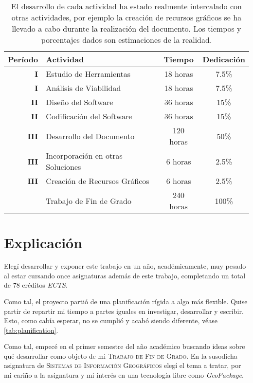 \begin{table}[htbp]
	\centering
	\begin{tabular}{ r ||l | c c}
		\textbf{Período} & \textbf{Actividad} & \textbf{Tiempo} & \textbf{Dedicación} \\
		\hline\hline
		\textbf{I} & Estudio de Herramientas & 18 horas & 7.5\% \\
		\textbf{I} & Análisis de Viabilidad & 18 horas & 7.5\% \\
		\textbf{II} & Diseño del Software & 36 horas & 15\% \\
		\textbf{II} & Codificación del Software & 36 horas & 15\% \\
		\textbf{III} & Desarrollo del Documento & 120 horas & 50\% \\
		\textbf{III} & Incorporación en otras Soluciones & 6 horas & 2.5\% \\
		\textbf{III} & Creación de Recursos Gráficos & 6 horas & 2.5\%\\
		\hline
		 & Trabajo de Fin de Grado & 240 horas & 100\%
	\end{tabular}
	\caption[Planificación por actividad]{El desarrollo de cada actividad ha estado realmente intercalado con otras actividades, por ejemplo la creación de recursos gráficos se ha llevado a cabo durante la realización del documento. Los tiempos y porcentajes dados son estimaciones de la realidad.}
	\label{tab:planification_tasks}
\end{table}

\section*{Explicación}
Elegí desarrollar y exponer este trabajo en un año, académicamente, muy pesado al estar cursando once asignaturas además de este trabajo, completando un total de 78 créditos \textit{ECTS}.

Como tal, el proyecto partió de una planificación rígida a algo más flexible. Quise partir de repartir mi tiempo a partes iguales en investigar, desarrollar y escribir. Esto, como cabía esperar, no se cumplió y acabó siendo diferente, véase \autoref{tab:planification}.

Como tal, empecé en el primer semestre del año académico buscando ideas sobre qué desarrollar como objeto de mi \textsc{Trabajo de Fin de Grado}. En la susodicha asignatura de \textsc{Sistemas de Información Geográficos} elegí el tema a tratar, por mi cariño a la asignatura y mi interés en una tecnología libre como \textit{GeoPackage}.

